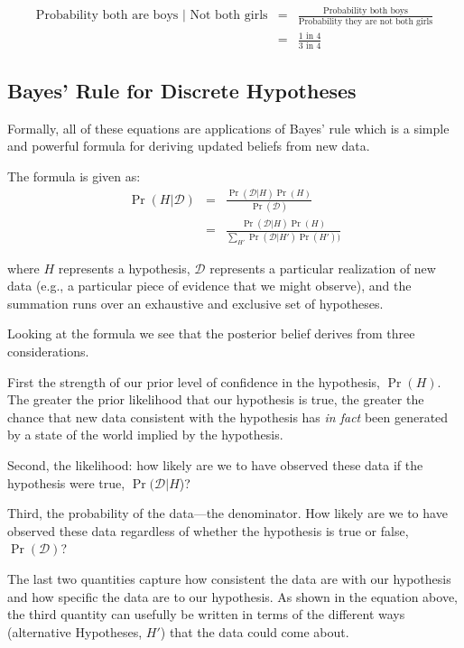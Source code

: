 \documentclass[
  12pt,
]{book}
\begin{document}
\begin{eqnarray}
\text{Probability both are boys | Not both girls} &=& \frac{\text{Probability  both boys}}{\text{Probability they are not both girls}} \\ 
&=& \frac{\text{1 in 4}}{\text{3 in 4}}
\end{eqnarray}

\hypertarget{bayes-rule-for-discrete-hypotheses}{%
\subsection{Bayes' Rule for Discrete Hypotheses}\label{bayes-rule-for-discrete-hypotheses}}

Formally, all of these equations are applications of Bayes' rule which is a simple and powerful formula for deriving updated beliefs from new data.

The formula is given as:
\begin{eqnarray}
\Pr(H|\mathcal{D})&=&\frac{\Pr(\mathcal{D}|H)\Pr(H)}{\Pr(\mathcal{D})}\\
                  &=&\frac{\Pr(\mathcal{D}|H)\Pr(H)}{\sum_{H'}\Pr(\mathcal{D}|H')\Pr(H'))}
\end{eqnarray}

where \(H\) represents a hypothesis, \(\mathcal{D}\) represents a particular realization of new data (e.g., a particular piece of evidence that we might observe), and the summation runs over an exhaustive and exclusive set of hypotheses.

Looking at the formula we see that the posterior belief derives from three considerations.

First the strength of our prior level of confidence in the hypothesis, \(\Pr(H)\). The greater the prior likelihood that our hypothesis is true, the greater the chance that new data consistent with the hypothesis has \emph{in fact} been generated by a state of the world implied by the hypothesis.

Second, the likelihood: how likely are we to have observed these data if the hypothesis were true, \(\Pr(\mathcal{D}|H\))?

Third, the probability of the data---the denominator. How likely are we to have observed these data regardless of whether the hypothesis is true or false, \(\Pr(\mathcal{D})\)?

The last two quantities capture how consistent the data are with our hypothesis and how specific the data are to our hypothesis. As shown in the equation above, the third quantity can usefully be written in terms of the different ways (alternative Hypotheses, \(H'\)) that the data could come about.
\end{document}

